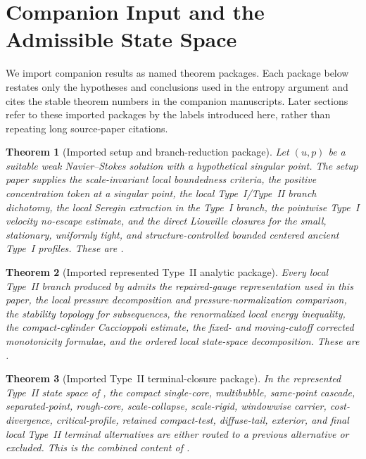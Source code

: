 \documentclass[11pt]{amsart}
\numberwithin{equation}{section}
\theoremstyle{plain}
\newtheorem{theorem}{Theorem}[section]
\theoremstyle{definition}
\theoremstyle{remark}
\begin{document}
\section{Companion Input and the Admissible State Space}
\label{sec:companion-input}

We import companion results as named theorem packages.  Each package below
restates only the hypotheses and conclusions used in the entropy argument and
cites the stable theorem numbers in the companion manuscripts.  Later sections
refer to these imported packages by the labels introduced here, rather than
repeating long source-paper citations.

\begin{theorem}[Imported setup and branch-reduction package]
\label{thm:companion-package}
\label{imp:setup-branch-reduction}
Let \((u,p)\) be a suitable weak Navier--Stokes solution with a hypothetical
singular point.  The setup paper supplies the scale-invariant local
boundedness criteria, the positive concentration token at a singular point,
the local Type~I/Type~II branch dichotomy, the local Seregin extraction in the
Type~I branch, the pointwise Type~I velocity no-escape estimate, and the
direct Liouville closures for the small, stationary, uniformly tight, and
structure-controlled bounded centered ancient Type~I profiles.  These are
\cite[Theorems~4.1, 4.2, 5.7, 6.5, 7.3, 8.4; Lemma~8.7; Theorems~15.7--15.9,
21.4, and~25.5]{BallesterSetup}.
\end{theorem}

\begin{theorem}[Imported represented Type~II analytic package]
\label{imp:typeii-analytic-package}
Every local Type~II branch produced by 
admits the repaired-gauge representation used in this paper, the local
pressure decomposition and pressure-normalization comparison, the stability
topology for subsequences, the renormalized local energy inequality, the
compact-cylinder Caccioppoli estimate, the fixed- and moving-cutoff corrected
monotonicity formulae, and the ordered local state-space decomposition.  These
are
\cite[Theorems~3.26, 3.36--3.38, 5.4, 9.11, 9.19, 10.3, 10.4, 10.17, 10.18,
and~10.25; Propositions~3.35 and~5.1; Lemma~5.3]{BallesterTypeII}.
\end{theorem}

\begin{theorem}[Imported Type~II terminal-closure package]
\label{imp:typeii-terminal-closures}
In the represented Type~II state space of ,
the compact single-core, multibubble, same-point cascade, separated-point,
rough-core, scale-collapse, scale-rigid, windowwise carrier, cost-divergence,
critical-profile, retained compact-test, diffuse-tail, exterior, and final
local Type~II terminal alternatives are either routed to a previous
alternative or excluded.  This is the combined content of
\cite[Theorems~2.19, 4.19, 4.20, 4.45, 5.4, 5.7, 6.7, 6.20, 6.24, 7.130,
8.6, 8.14, 8.38, 8.41, 8.46, 9.42, 9.82, 9.85, 9.89, 9.91, 9.94, 9.103,
9.113, 9.134, 9.139, 10.5, 10.6, 10.38, and~10.39; Corollaries~7.123,
7.128, 9.43, and~9.142; Proposition~4.43]{BallesterTypeII}.
\end{theorem}
\end{document}
